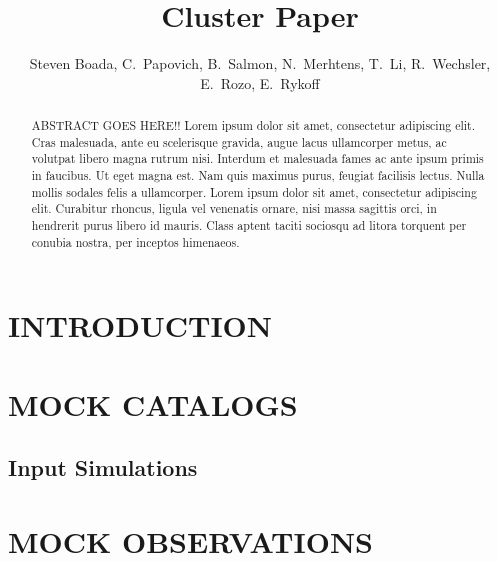 \documentclass[apj, revtex4]{emulateapj}
\begin{document}
\title{Cluster Paper}

\author{\sc Steven Boada, 
C.~Papovich,
B.~Salmon, 
N.~Merhtens,
T.~Li, 
R.~Wechsler,
E.~Rozo,
E.~Rykoff} 


\begin{abstract}
\noindent
ABSTRACT GOES HERE!!
Lorem ipsum dolor sit amet, consectetur adipiscing elit. Cras malesuada, ante eu scelerisque gravida, augue lacus ullamcorper metus, ac volutpat libero magna rutrum nisi. Interdum et malesuada fames ac ante ipsum primis in faucibus. Ut eget magna est. Nam quis maximus purus, feugiat facilisis lectus. Nulla mollis sodales felis a ullamcorper. Lorem ipsum dolor sit amet, consectetur adipiscing elit. Curabitur rhoncus, ligula vel venenatis ornare, nisi massa sagittis orci, in hendrerit purus libero id mauris. Class aptent taciti sociosqu ad litora torquent per conubia nostra, per inceptos himenaeos.
\end{abstract}

\section{INTRODUCTION}

\section{MOCK CATALOGS}
\subsection{Input Simulations}

\section{MOCK OBSERVATIONS}
\end{document}
